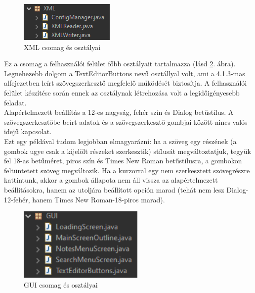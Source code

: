 \begin{figure}[h]
	\centering
	\includegraphics[scale=0.7]{images/package_xml.png}
	\caption{XML csomag és osztályai}
	\label{fig:package_xml}
\end{figure}

Ez a csomag a felhasználói felület főbb osztályait tartalmazza (lásd \ref{fig:package_gui}. ábra).
\vspace{5pt}\\Legnehezebb dolgom a TextEditorButtons nevű osztállyal volt, ami a 4.1.3-mas alfejezetben leírt szövegszerkesztő megfelelő működését biztosítja. A felhasználói felület készítése során ennek az osztálynak létrehozása volt a legidőigényesebb feladat.
\\Alapértelmezett beállítás a 12-es nagyság, fehér szín és Dialog betűstílus. A szövegszerkesztőbe beírt adatok és a szövegszerkesztő gombjai között nincs valós-idejű kapcsolat.
\\Ezt egy példával tudom legjobban elmagyarázni: ha a szöveg egy részének (a gombok ugye csak a kijelölt részeket szerkesztik) stílusát megváltoztatjuk, tegyük fel 18-as betűméret, piros szín és Times New Roman betűstílusra, a gombokon feltüntetett szöveg megváltozik. Ha a kurzorral egy nem szerkesztett szövegrészre kattintunk, akkor a gombok állapota nem áll vissza az alapértelmezett beállításokra, hanem az utoljára beállított opción marad (tehát nem lesz Dialog-12-fehér, hanem Times New Roman-18-piros marad).


\begin{figure}[h]
	\centering
	\includegraphics[scale=0.7]{images/package_gui.png}
	\caption{GUI csomag és osztályai}
	\label{fig:package_gui}
\end{figure}


